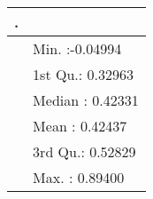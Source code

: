 \begin{table}[!tbp]
\begin{center}
\begin{tabular}{ll}
\hline\hline
\multicolumn{1}{l}{.}&\multicolumn{1}{c}{}\tabularnewline
\hline
&Min.   :-0.04994  \tabularnewline
&1st Qu.: 0.32963  \tabularnewline
&Median : 0.42331  \tabularnewline
&Mean   : 0.42437  \tabularnewline
&3rd Qu.: 0.52829  \tabularnewline
&Max.   : 0.89400  \tabularnewline
\hline
\end{tabular}\end{center}
\end{table}
